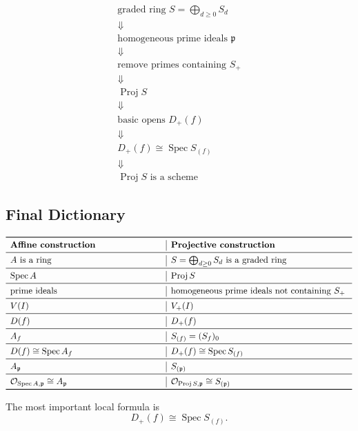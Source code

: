 \documentclass[12pt,a4paper]{article}
\DeclareMathOperator{\Spec}{Spec}
\DeclareMathOperator{\Proj}{Proj}
\theoremstyle{notespace}
\begin{document}
\[
\begin{array}{c}
	\text{graded ring }S=\bigoplus_{d\ge 0}S_d
	\\[6pt]
	\Downarrow
	\\[6pt]
	\text{homogeneous prime ideals }\mathfrak p
	\\[6pt]
	\Downarrow
	\\[6pt]
	\text{remove primes containing }S_+
	\\[6pt]
	\Downarrow
	\\[6pt]
	\Proj S
	\\[6pt]
	\Downarrow
	\\[6pt]
	\text{basic opens }D_+(f)
	\\[6pt]
	\Downarrow
	\\[6pt]
	D_+(f)\cong\Spec S_{(f)}
	\\[6pt]
	\Downarrow
	\\[6pt]
	\Proj S\text{ is a scheme}
\end{array}
\]

\subsection{Final Dictionary}

\[
\begin{array}{>{\raggedright\arraybackslash}p{6cm}
		|>{\raggedright\arraybackslash}p{7cm}}
	\toprule
	\textbf{Affine construction} & \textbf{Projective construction} \\
	\midrule
	\(A\) is a ring
	&
	\(S=\bigoplus_{d\ge 0}S_d\) is a graded ring
	\\
	\midrule
	\(\Spec A\)
	&
	\(\Proj S\)
	\\
	\midrule
	prime ideals
	&
	homogeneous prime ideals not containing \(S_+\)
	\\
	\midrule
	\(V(I)\)
	&
	\(V_+(I)\)
	\\
	\midrule
	\(D(f)\)
	&
	\(D_+(f)\)
	\\
	\midrule
	\(A_f\)
	&
	\(S_{(f)}=(S_f)_0\)
	\\
	\midrule
	\(D(f)\cong\Spec A_f\)
	&
	\(D_+(f)\cong\Spec S_{(f)}\)
	\\
	\midrule
	\(A_{\mathfrak p}\)
	&
	\(S_{(\mathfrak p)}\)
	\\
	\midrule
	\(\mathcal O_{\Spec A,\mathfrak p}\cong A_{\mathfrak p}\)
	&
	\(\mathcal O_{\Proj S,\mathfrak p}\cong S_{(\mathfrak p)}\)
	\\
	\bottomrule
\end{array}
\]

The most important local formula is
\[
\boxed{
	D_+(f)\cong\Spec S_{(f)}.
}
\]
\end{document}
